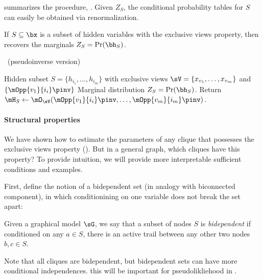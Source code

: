  summarizes the procedure, \LearnClique.
Given $Z_S$, the conditional probability tables for $S$ can easily be
obtained via renormalization.
\begin{theorem}
If $S \subseteq \bx$ is a subset of hidden variables with the exclusive views property,
then  recovers the marginals $Z_S = \Pr(\bh_S)$.
\end{theorem}

\begin{algorithm}
  \caption{\LearnClique~(pseudoinverse version)}
  \label{algo:learnclique}
  \begin{algorithmic}
    \REQUIRE Hidden subset $S = \{ h_{i_1}, \dots, h_{i_m} \}$ with exclusive views $\sV = \{ x_{v_1}, \dots, x_{v_m} \}$
    and $\{\mOpp{v_1}{i_i}\pinv\}$ %
    \ENSURE Marginal distribution $Z_S = \Pr(\bh_S)$.
      \STATE Return $\mH_S \gets \mO_{\sV}( \mOpp{v_1}{i_i}\pinv, \dots, {\mOpp{v_m}{i_m}}\pinv )$.
  \end{algorithmic}
\end{algorithm}

\paragraph{Structural properties}

We have shown how to estimate the parameters of any clique that possesses the exclusive
  views property ().
  But in a general graph, which cliques have this property?
  To provide intuition, we will provide more interpretable sufficient conditions
  and examples.

First, define the notion of a bidependent set (in analogy with biconnected component),
in which conditionining on one variable does not break the set apart:
\begin{definition}
Given a graphical model $\sG$, we say that a subset of nodes $S$ is \emph{bidependent} if
conditioned on any $a \in S$, there is an active trail between any other two nodes $b,c \in S$.
\end{definition}
Note that all cliques are bidependent, but bidependent sets can have more conditional independences.
this will be important for pseudolikliehood in .

